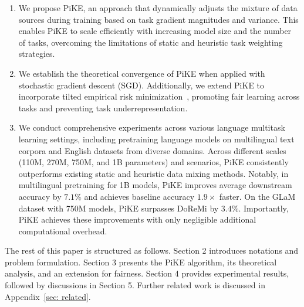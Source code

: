 %
\begin{enumerate}[leftmargin=*]
\item  We propose PiKE, an approach that dynamically adjusts the mixture of data sources during training based on task gradient magnitudes and variance. This enables PiKE to scale efficiently with increasing model size and the number of tasks, overcoming the limitations of static  and heuristic task weighting strategies.


\item  We establish the theoretical convergence of PiKE when applied with stochastic gradient descent (SGD). Additionally, we extend PiKE to incorporate tilted empirical risk minimization~\citep{li2020tilted, mo2000fair}, promoting fair learning across tasks and preventing task underrepresentation.


\item  We conduct comprehensive experiments across various language multitask learning settings, including pretraining language models on multilingual text corpora and English datasets from diverse domains. Across different scales (110M, 270M, 750M, and 1B parameters) and scenarios, PiKE consistently outperforms existing static and heuristic data mixing methods. Notably, in multilingual pretraining for 1B models, PiKE improves average downstream accuracy by $7.1\%$ and achieves baseline accuracy $1.9\times$ faster. On the GLaM dataset with 750M models, PiKE surpasses DoReMi \citep{xie2024doremi} by $3.4\%$. Importantly, PiKE achieves these improvements with only negligible additional computational overhead.

\end{enumerate}

The rest of this paper is structured as follows. Section 2 introduces notations and problem formulation. Section 3 presents the PiKE algorithm, its theoretical analysis, and an extension for fairness. Section 4 provides experimental results, followed by discussions in Section 5. Further related work is  discussed in Appendix~\ref{sec: related}.
    
%








%
%



%

%


%

%


